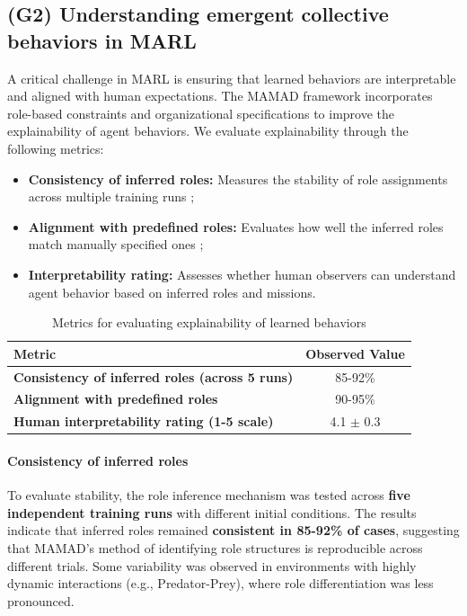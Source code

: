 \documentclass[pdflatex,sn-mathphys-num]{sn-jnl}%
\theoremstyle{thmstyleone}%
\theoremstyle{thmstyletwo}%
\theoremstyle{thmstylethree}%
\begin{document}
\subsection{(G2) Understanding emergent collective behaviors in MARL}

A critical challenge in MARL is ensuring that learned behaviors are interpretable and aligned with human expectations. The MAMAD framework incorporates role-based constraints and organizational specifications to improve the explainability of agent behaviors. We evaluate explainability through the following metrics:

\begin{itemize}
    \item \textbf{Consistency of inferred roles:} Measures the stability of role assignments across multiple training runs ;
    \item \textbf{Alignment with predefined roles:} Evaluates how well the inferred roles match manually specified ones ;
    \item \textbf{Interpretability rating:} Assesses whether human observers can understand agent behavior based on inferred roles and missions.
\end{itemize}

\begin{table}[h!]
    \centering
    \caption{Metrics for evaluating explainability of learned behaviors}
    \begin{tabular}{|l|c|}
        \hline
        \textbf{Metric}                                        & \textbf{Observed Value} \\
        \hline
        \textbf{Consistency of inferred roles (across 5 runs)} & 85-92\%                 \\
        \hline
        \textbf{Alignment with predefined roles}               & 90-95\%                 \\
        \hline
        \textbf{Human interpretability rating (1-5 scale)}     & 4.1 $\pm$ 0.3           \\
        \hline
    \end{tabular}
    \label{tab:explainability}
\end{table}

\paragraph{Consistency of inferred roles}
To evaluate stability, the role inference mechanism was tested across \textbf{five independent training runs} with different initial conditions. The results indicate that inferred roles remained \textbf{consistent in 85-92\% of cases}, suggesting that MAMAD’s method of identifying role structures is reproducible across different trials. Some variability was observed in environments with highly dynamic interactions (e.g., Predator-Prey), where role differentiation was less pronounced.
\end{document}
